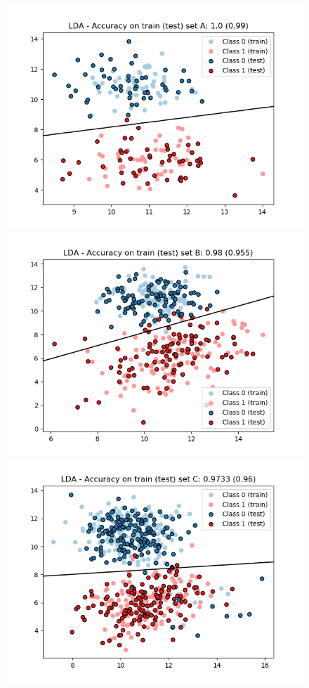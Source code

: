 \documentclass[a4paper, 11pt]{report}
\begin{document}
\begin{enumerate}[label=\alph*]
        \begin{figure}[!htb]
          \includegraphics[width=\linewidth]{./images/LDA_A.png}
          \label{fig:lda_a}
        \endminipage\hfill
          \includegraphics[width=\linewidth]{./images/LDA_B.png}
          \label{fig:lda_b}
        \endminipage\hfill
        \vspace*{-.8cm}
          \includegraphics[width=\linewidth]{./images/LDA_C.png}

\end{figure}
\end{enumerate}
\end{document}
